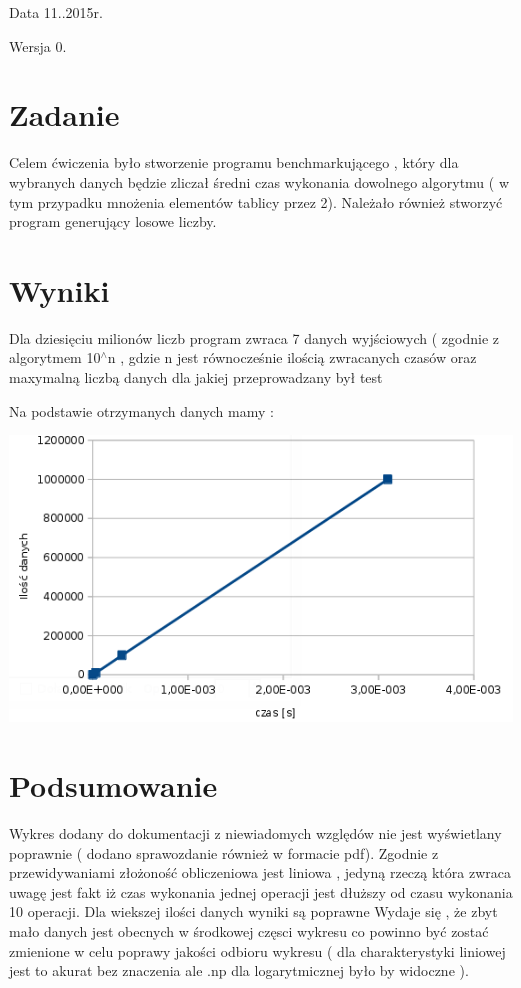 \begin{DoxyDate}{Data}
11..\-2015r. 
\end{DoxyDate}
\begin{DoxyVersion}{Wersja}
0. 
\end{DoxyVersion}
\hypertarget{_sprawozdanie_Zadanie}{}\section{Zadanie}\label{_sprawozdanie_Zadanie}
Celem ćwiczenia było stworzenie programu benchmarkującego , który dla wybranych danych będzie zliczał średni czas wykonania dowolnego algorytmu ( w tym przypadku mnożenia elementów tablicy przez 2). Należało również stworzyć program generujący losowe liczby.\hypertarget{_sprawozdanie_Wyniki}{}\section{Wyniki}\label{_sprawozdanie_Wyniki}
Dla dziesięciu milionów liczb program zwraca 7 danych wyjściowych ( zgodnie z algorytmem 10$^\wedge$n , gdzie n jest równocześnie ilością zwracanych czasów oraz maxymalną liczbą danych dla jakiej przeprowadzany był test

Na podstawie otrzymanych danych mamy \-:


\begin{DoxyImageNoCaption}
  \mbox{\includegraphics{1.jpg}}
\end{DoxyImageNoCaption}
\hypertarget{_sprawozdanie_Podsumowanie}{}\section{Podsumowanie}\label{_sprawozdanie_Podsumowanie}
Wykres dodany do dokumentacji z niewiadomych względów nie jest wyświetlany poprawnie ( dodano sprawozdanie również w formacie pdf). Zgodnie z przewidywaniami złożoność obliczeniowa jest liniowa , jedyną rzeczą która zwraca uwagę jest fakt iż czas wykonania jednej operacji jest dłuższy od czasu wykonania 10 operacji. Dla wiekszej ilości danych wyniki są poprawne Wydaje się , że zbyt mało danych jest obecnych w środkowej częsci wykresu co powinno być zostać zmienione w celu poprawy jakości odbioru wykresu ( dla charakterystyki liniowej jest to akurat bez znaczenia ale .np dla logarytmicznej było by widoczne ). 